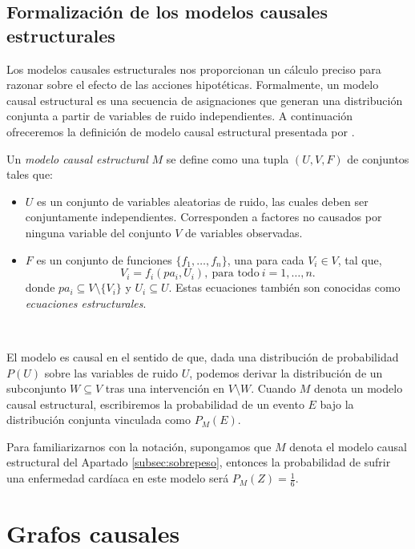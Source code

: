 \documentclass[oneside,openright,titlepage,numbers=noenddot,openany,headinclude,footinclude=true,
cleardoublepage=empty,abstractoff,BCOR=5mm,paper=a4,fontsize=12pt,main=spanish]{scrreprt}
\begin{document}
\subsection{Formalización de los modelos causales estructurales}

Los modelos causales estructurales nos proporcionan un cálculo preciso para razonar sobre el efecto de las acciones hipotéticas. Formalmente, un modelo causal estructural es una secuencia de asignaciones que generan una distribución conjunta a partir de variables de ruido independientes. A continuación ofreceremos la definición de modelo causal estructural presentada por \cite{causality2000}.\\

\begin{definition} \label{def:modcausalest}
Un \textit{modelo causal estructural} $M$ se define como una tupla $(U,V,F)$ de conjuntos tales que:
\begin{itemize}
    \item $U$ es un conjunto de variables aleatorias de ruido, las cuales deben ser conjuntamente independientes. Corresponden a factores no causados por ninguna variable del conjunto $V$ de variables observadas.
    \item $F$ es un conjunto de funciones $\{f_1,\dots,f_n\}$, una para cada $V_i\in V$, tal que, $$V_i=f_i(pa_i,U_i), \ \text{para todo} \ i=1,\dots,n.$$
    donde $pa_i \subseteq V \setminus \{V_i\}$ y $U_i \subseteq U$. Estas ecuaciones también son conocidas como \textit{ecuaciones estructurales}.
\end{itemize}
\end{definition}\

El modelo es causal en el sentido de que, dada una distribución de probabilidad $P(U)$ sobre las variables de ruido $U$, podemos derivar la distribución de un subconjunto $W \subseteq V$ tras una intervención en $V \setminus W$. Cuando $M$ denota un modelo causal estructural, escribiremos la probabilidad de un evento $E$ bajo la distribución conjunta vinculada como $P_M(E)$. 

Para familiarizarnos con la notación, supongamos que $M$ denota el modelo causal estructural del Apartado \ref{subsec:sobrepeso}, entonces la probabilidad de sufrir una enfermedad cardíaca en este modelo será $P_M(Z) = \frac{1}{6}$.

\section{Grafos causales}
\end{document}

